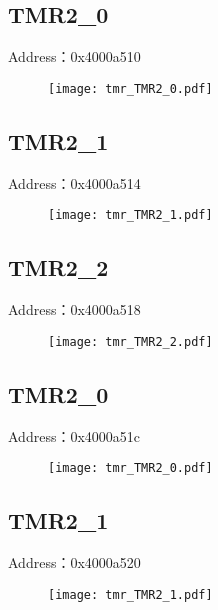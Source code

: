 \subsection{TMR2\_0}
\label{tmr-TMR2-0}
Address：0x4000a510
 \begin{figure}[H]
\texttt{[image: tmr\_TMR2\_0.pdf]}
\end{figure}

\subsection{TMR2\_1}
\label{tmr-TMR2-1}
Address：0x4000a514
 \begin{figure}[H]
\texttt{[image: tmr\_TMR2\_1.pdf]}
\end{figure}

\subsection{TMR2\_2}
\label{tmr-TMR2-2}
Address：0x4000a518
 \begin{figure}[H]
\texttt{[image: tmr\_TMR2\_2.pdf]}
\end{figure}

\subsection{TMR2\_0}
\label{tmr-TMR2-0}
Address：0x4000a51c
 \begin{figure}[H]
\texttt{[image: tmr\_TMR2\_0.pdf]}
\end{figure}

\subsection{TMR2\_1}
\label{tmr-TMR2-1}
Address：0x4000a520
 \begin{figure}[H]
\texttt{[image: tmr\_TMR2\_1.pdf]}
\end{figure}

